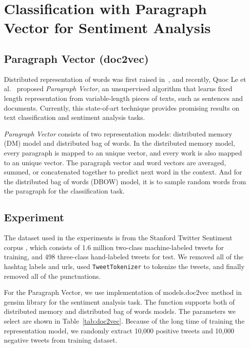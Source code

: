 \section{Classification with Paragraph Vector for Sentiment Analysis}\label{sec.doc2vec}

\subsection{Paragraph Vector (doc2vec)}
Distributed representation of words was first raised in~\cite{rumelhart1988}, and recently, Quoc Le et al.~\cite{le2014} proposed {\textit{Paragraph Vector}}, an unsupervised algorithm that learns fixed length representation from variable-length pieces of texts, such as sentences and documents. Currently, this state-of-art technique provides promising results on text classification and sentiment analysis tasks.

{\textit{Paragraph Vector}} consists of two representation models: distributed memory (DM) model and distributed bag of words. In the distributed memory model, every paragraph is mapped to an unique vector, and every work is also mapped to an unique vector. The paragraph vector and word vectors are averaged, summed, or concatenated together to predict next word in the context. And for the distributed bag of words (DBOW) model, it is to sample random words from the paragraph for the classification task.


\subsection{Experiment}
The dataset used in the experiments is from the Stanford Twitter Sentiment corpus \cite{go2009}, which consists of 1.6 million two-class machine-labeled tweets for training, and 498 three-class hand-labeled tweets for test. We removed all of the hashtag labels and urls, used {\tt TweetTokenizer} to tokenize the tweets, and finally removed all of the punctuations. 

For the Paragraph Vector, we use implementation of models.doc2vec method in gensim library for the sentiment analysis task. The function supports both of distributed memory and distributed bag of words models. The parameters we select are shown in Table~\ref{tab:doc2vec}. Because of the long time of training the representation model, we randomly extract 10,000 positive tweets and 10,000 negative tweets from training dataset.


